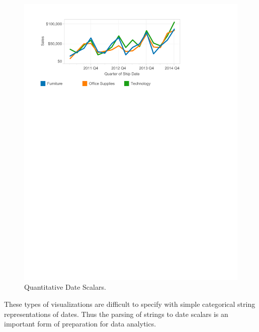 \begin{figure}[ht]
\centering
\includegraphics[width=\columnwidth]{figures/FigureI2}
\caption{Quantitative Date Scalars.}
\label{fig:I2}
\end{figure}

These types of visualizations are difficult to specify with simple categorical string representations of dates. Thus the parsing of strings to date scalars is an important form of preparation for data analytics.

